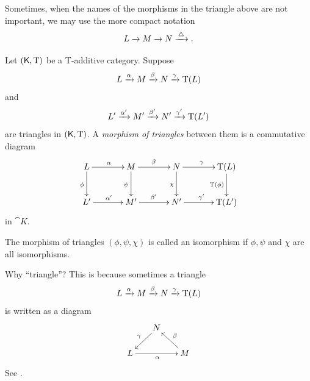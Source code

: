 Sometimes, when the names of the morphisms in the triangle above are not 
important, we may use the more compact notation 
\begin{equation} \label{eqn:4910}
L \xrightarrow{} M \xrightarrow{} N \xrightarrow{ \, \triangle \, } .
\end{equation}

\begin{dfn} \label{dfn:1157} 
Let $(\operatorname{\mathsf{K}}, \operatorname{T})$ be a T-additive category. Suppose 
\[  L \xrightarrow{\alpha} M \xrightarrow{\beta} N \xrightarrow{\gamma} \operatorname{T}(L) \]
and 
\[ L' \xrightarrow{\alpha'} M' \xrightarrow{\beta'} N' \xrightarrow{\gamma'} \operatorname{T}(L') \]
are triangles in  $(\operatorname{\mathsf{K}}, \operatorname{T})$. 
A {\em morphism of triangles}
between them is a commutative diagram 
\[ \UseTips  \xymatrix @C=8ex @R=6ex { 
L 
\ar[r]^{\al}
\ar[d]_{\phi}
&
M
\ar[r]^{\be}
\ar[d]_{\psi}
& 
N
\ar[r]^{\ga}
\ar[d]_{\chi}
&
\opn{T}(L)
\ar[d]_{\opn{T}(\phi)}
\\
L' 
\ar[r]^{\al'}
&
M'
\ar[r]^{\be'}
& 
N'
\ar[r]^{\ga'}
&
\opn{T}(L') 
} \]
in $\cat{K}$. 

The morphism of triangles $(\phi, \psi, \chi)$ is called an isomorphism if 
$\phi, \psi$ and $\chi$ are all isomorphisms. 
\end{dfn}

\begin{rem} \label{rem:4690}
Why ``triangle''? This is because sometimes a triangle 
\[ L \xrightarrow{\alpha} M \xrightarrow{\beta} N \xrightarrow{\gamma} \operatorname{T}(L) \]
is written as a diagram
\[ \UseTips  \xymatrix @C=4ex @R=4ex {
& 
N 
\ar[dl]_{\ga}
\\
L
\ar[rr]_{\al}
& &
M
\ar[lu]_{\be}
} \]
See \cite[page 20]{RD}. 
\end{rem}

